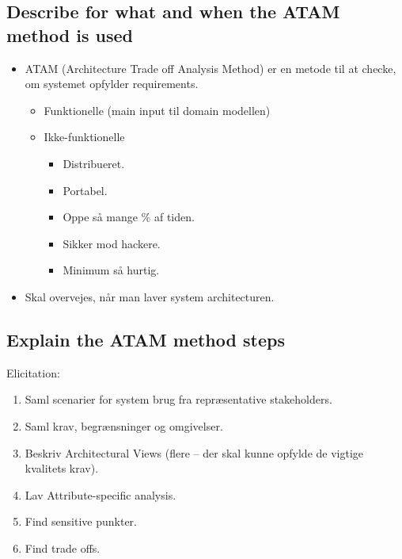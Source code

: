 \documentclass{article}
\begin{document}
\subsection{Describe for what and when the ATAM method is used}
\begin{itemize}
	\item ATAM (Architecture Trade off Analysis Method) er en metode til at checke, om systemet opfylder requirements.
	\begin{itemize}
		\item Funktionelle (main input til domain modellen)
		\item Ikke-funktionelle 
		\begin{itemize}
			\item Distribueret.
			\item Portabel.
			\item Oppe så mange \% af tiden.
			\item Sikker mod hackere.
			\item Minimum så hurtig.
		\end{itemize}
	\end{itemize}
	\item Skal overvejes, når man laver system architecturen.
\end{itemize}


\subsection{Explain the ATAM method steps}

Elicitation:
\vspace{-10pt}
\begin{enumerate}
	\item Saml scenarier for system brug fra repræsentative stakeholders.
	\item Saml krav, begrænsninger og omgivelser.
	\item Beskriv Architectural Views (flere -- der skal kunne opfylde de vigtige kvalitets krav).
	\item Lav Attribute-specific analysis.
	\item Find sensitive punkter.
	\item Find trade offs.
\end{enumerate}
\end{document}
